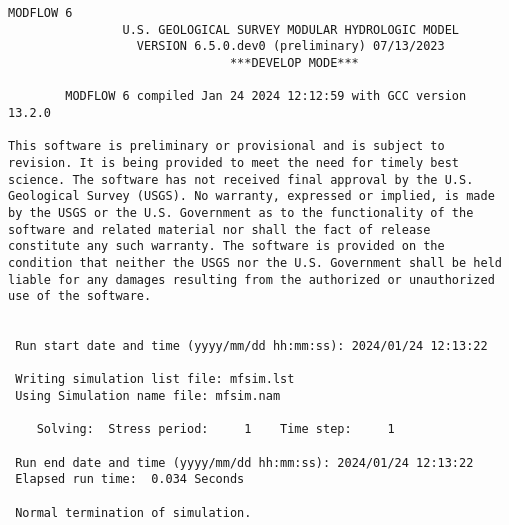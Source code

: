 {\small
\begin{lstlisting}[style=modeloutput]
                                   MODFLOW 6
                U.S. GEOLOGICAL SURVEY MODULAR HYDROLOGIC MODEL
                  VERSION 6.5.0.dev0 (preliminary) 07/13/2023
                               ***DEVELOP MODE***

        MODFLOW 6 compiled Jan 24 2024 12:12:59 with GCC version 13.2.0

This software is preliminary or provisional and is subject to 
revision. It is being provided to meet the need for timely best 
science. The software has not received final approval by the U.S. 
Geological Survey (USGS). No warranty, expressed or implied, is made 
by the USGS or the U.S. Government as to the functionality of the 
software and related material nor shall the fact of release 
constitute any such warranty. The software is provided on the 
condition that neither the USGS nor the U.S. Government shall be held 
liable for any damages resulting from the authorized or unauthorized 
use of the software.


 Run start date and time (yyyy/mm/dd hh:mm:ss): 2024/01/24 12:13:22

 Writing simulation list file: mfsim.lst
 Using Simulation name file: mfsim.nam

    Solving:  Stress period:     1    Time step:     1

 Run end date and time (yyyy/mm/dd hh:mm:ss): 2024/01/24 12:13:22
 Elapsed run time:  0.034 Seconds

 Normal termination of simulation.
\end{lstlisting}
}

